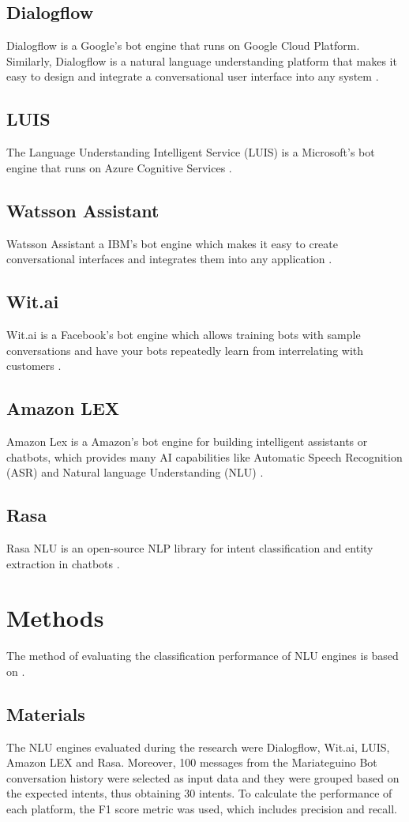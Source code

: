 \documentclass[conference]{IEEEtran}
\begin{document}
\subsection{Dialogflow}
Dialogflow is a Google's bot engine that runs on Google Cloud Platform. Similarly, Dialogflow is a natural language understanding platform that makes it easy to design and integrate a conversational user interface into any system \cite{dialogflow2020}.
\subsection{LUIS}
The Language Understanding Intelligent Service (LUIS) is a Microsoft's bot engine that runs on Azure Cognitive Services \cite{pathak2018iot}.
\subsection{Watsson Assistant}
Watsson Assistant a IBM's bot engine which makes it easy to create conversational interfaces and integrates them into any application \cite{sabharwal2019developing}.
\subsection{Wit.ai}
Wit.ai is a Facebook's bot engine which allows training bots with sample conversations and have your bots repeatedly learn from interrelating with customers \cite{seligman2018artificial}.
\subsection{Amazon LEX}
Amazon Lex is a Amazon's bot engine for building intelligent assistants or chatbots, which provides many AI capabilities like Automatic Speech Recognition (ASR) and Natural language Understanding (NLU) \cite{tripuraneni2019hands}.
\subsection{Rasa}
Rasa NLU is an open-source NLP library for intent classification and entity extraction in chatbots \cite{raj2018building}.

\section{Methods}
The method of evaluating the classification performance of NLU engines is based on \cite{Braun2017}.
\subsection{Materials}
The NLU engines evaluated during the research were Dialogflow, Wit.ai, LUIS, Amazon LEX and Rasa. Moreover, 100 messages from the Mariateguino Bot conversation history were selected as input data and they were grouped based on the expected intents, thus obtaining 30 intents. To calculate the performance of each platform, the F1 score metric was used, which includes precision and recall.
\end{document}
